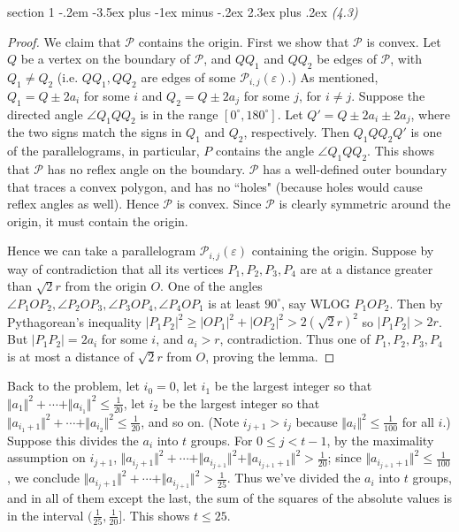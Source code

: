 \documentclass[12pt]{article}
\makeatletter
\theoremstyle{norm}
\providecommand{\cal}[1]{\mathcal{#1}}
\renewcommand{\cal}[1]{\mathcal{#1}}
\newcommand{\rc}[1]{\frac{1}{#1}}
\newcommand{\ep}[0]{\varepsilon}
\newenvironment{problem}{\@startsection
       {section}
       {1}
       {-.2em}
       {-3.5ex plus -1ex minus -.2ex}
       {2.3ex plus .2ex}
       {\pagebreak[3]%
       \large\bf\noindent{Problem }
       }
       }
       {%
       }
\makeatother
\begin{document}
\begin{problem} {\it (4.3)}
\begin{proof}
We claim that $\cal P$ contains the origin. First we show that $\cal P$ is convex. %
Let $Q$ be a vertex on the boundary of $\cal P$, %
and $QQ_1$ and $QQ_2$ be edges of $\cal P$, with $Q_1\ne Q_2$ (i.e. $QQ_1,QQ_2$ are edges of some $\cal P_{i,j}(\ep)$.)
As mentioned, $Q_1=Q\pm 2a_i$ for some $i$ and $Q_2=Q\pm 2a_j$ for some $j$, for $i\neq j$. 
Suppose the directed angle $\angle Q_1QQ_2$ is in the range $[0^{\circ},180^{\circ}]$. Let $Q'=Q\pm 2a_i\pm 2a_j$, where the two signs match the signs in $Q_1$ and $Q_2$, respectively. Then $Q_1QQ_2Q'$ is one of the parallelograms, in particular, $P$ contains the angle $\angle Q_1QQ_2$. %
This shows that $\cal P$ has no reflex angle on the boundary. $\cal P$ has a well-defined outer boundary that traces a convex polygon, and has no ``holes" (because holes would cause reflex angles as well). Hence $\cal P$ is convex. Since $\cal P$ is clearly symmetric around the origin, it must contain the origin.

Hence we can take a parallelogram $\cal P_{i,j}(\ep)$ containing the origin. Suppose by way of contradiction that all its vertices $P_1,P_2,P_3,P_4$ are at a distance greater than $\sqrt 2 r$ from the origin $O$. One of the angles $\angle P_1OP_2,\angle P_2OP_3,\angle P_3OP_4,\angle P_4OP_1$ is at least $90^{\circ}$, say WLOG $P_1OP_2$. Then by Pythagorean's inequality $|P_1P_2|^2\ge |OP_1|^2+|OP_2|^2> 2(\sqrt 2r)^2$ so $|P_1P_2|>2r$. But $|P_1P_2|=2a_i$ for some $i$, and $a_i>r$, contradiction. Thus one of $P_1,P_2,P_3,P_4$ is at most a distance of $\sqrt 2r$ from $O$, proving the lemma. 
\end{proof}
Back to the problem, let $i_0=0$, let $i_1$ be the largest integer so that $\Vert a_1\Vert^2 +\cdots +\Vert a_{i_1}\Vert ^2\le \rc{20}$, let $i_2$ be the largest integer so that $\Vert a_{i_1+1}\Vert^2 +\cdots +\Vert a_{i_2}\Vert^2 \le \rc {20}$, and so on. (Note $i_{j+1}>i_j$ because $\Vert a_i\Vert^2\le \rc{100}$ for all $i$.) Suppose this divides the $a_i$ into $t$ groups. For $0\le j<t-1$, by the maximality assumption on $i_{j+1}$,  $\Vert a_{i_j+1}\Vert^2 +\cdots +\Vert a_{i_{j+1}}\Vert ^2+\Vert a_{i_{j+1}+1}\Vert^2 >\rc {20}$; since $\Vert a_{i_{j+1}+1}\Vert^2\le \rc{100}$, we conclude $\Vert a_{i_j+1}\Vert^2 +\cdots +\Vert a_{i_{j+1}}\Vert^2 >\rc{25}$. Thus we've divided the $a_i$ into $t$ groups, and in all of them except the last, the sum of the squares of the absolute values is in the interval $(\rc{25},\rc{20}]$. This shows $t\le 25$.


\end{problem}
\end{document}
